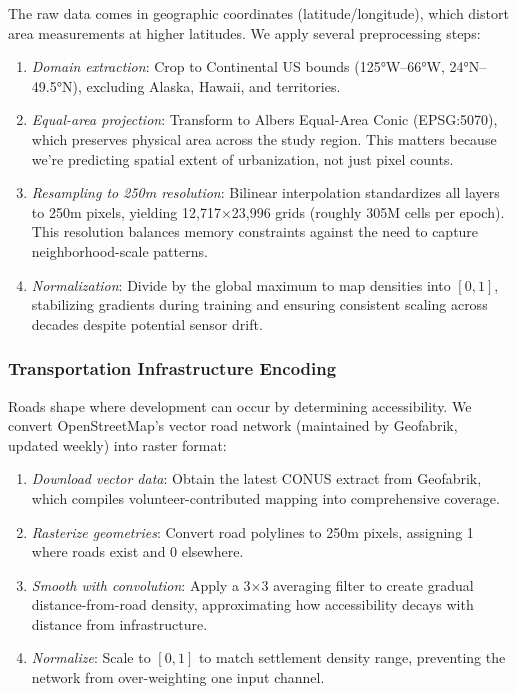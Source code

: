 \documentclass[conference]{IEEEtran}
\begin{document}
The raw data comes in geographic coordinates (latitude/longitude), which distort area measurements at higher latitudes. We apply several preprocessing steps:
\begin{enumerate}
    \item \textit{Domain extraction}: Crop to Continental US bounds (125°W--66°W, 24°N--49.5°N), excluding Alaska, Hawaii, and territories.
    
    \item \textit{Equal-area projection}: Transform to Albers Equal-Area Conic (EPSG:5070), which preserves physical area across the study region. This matters because we're predicting spatial extent of urbanization, not just pixel counts.
    
    \item \textit{Resampling to 250m resolution}: Bilinear interpolation standardizes all layers to 250m pixels, yielding 12,717$\times$23,996 grids (roughly 305M cells per epoch). This resolution balances memory constraints against the need to capture neighborhood-scale patterns.
    
    \item \textit{Normalization}: Divide by the global maximum to map densities into $[0,1]$, stabilizing gradients during training and ensuring consistent scaling across decades despite potential sensor drift.
\end{enumerate}

\subsubsection{Transportation Infrastructure Encoding}
Roads shape where development can occur by determining accessibility. We convert OpenStreetMap's vector road network (maintained by Geofabrik, updated weekly) into raster format:
\begin{enumerate}
    \item \textit{Download vector data}: Obtain the latest CONUS extract from Geofabrik, which compiles volunteer-contributed mapping into comprehensive coverage.
    
    \item \textit{Rasterize geometries}: Convert road polylines to 250m pixels, assigning 1 where roads exist and 0 elsewhere.
    
    \item \textit{Smooth with convolution}: Apply a 3$\times$3 averaging filter to create gradual distance-from-road density, approximating how accessibility decays with distance from infrastructure.
    
    \item \textit{Normalize}: Scale to $[0,1]$ to match settlement density range, preventing the network from over-weighting one input channel.
\end{enumerate}
\end{document}
